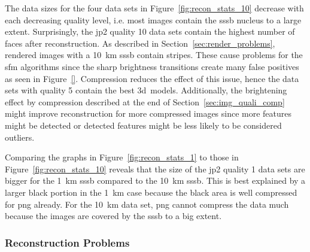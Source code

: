The data sizes for the four data sets in Figure~\ref{fig:recon_stats_10} decrease with each decreasing quality level, i.e. most images contain the \gls{sssb} nucleus to a large extent. Surprisingly, the \gls{jp2} quality 10 data sets contain the highest number of faces after reconstruction. As described in Section~\ref{sec:render_problems}, rendered images with a \SI{10}{\kilo\meter} \gls{sssb} contain stripes. These cause problems for the \gls{sfm} algorithms since the sharp brightness transitions create many false positives as seen in Figure~\ref{}. Compression reduces the effect of this issue, hence the data sets with quality 5 contain the best \gls{3d}~models. Additionally, the brightening effect by compression described at the end of Section~\ref{sec:img_quali_comp} might improve reconstruction for more compressed images since more features might be detected or detected features might be less likely to be considered outliers.

Comparing the graphs in Figure~\ref{fig:recon_stats_1} to those in Figure~\ref{fig:recon_stats_10} reveals that the size of the \gls{jp2} quality 1 data sets are bigger for the \SI{1}{\kilo\meter} \gls{sssb} compared to the \SI{10}{\kilo\meter} \gls{sssb}. This is best explained by a larger black portion in the \SI{1}{\kilo\meter} case because the black area is well compressed for \gls{png} already. For the \SI{10}{\kilo\meter} data set, \gls{png} cannot compress the data much because the images are covered by the \gls{sssb} to a big extent.

\subsubsection{Reconstruction Problems} \label{sec:recon_problems}

